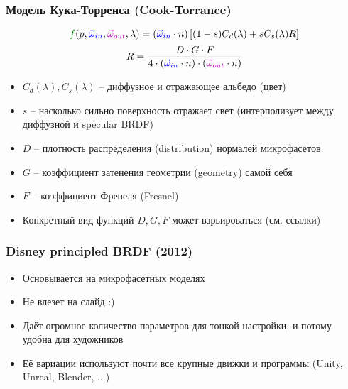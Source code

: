\documentclass{beamer}
\begin{document}
\begin{frame}[fragile]
\frametitle{Модель Кука-Торренса (Cook-Torrance)}
\begin{equation*}
{\color{green}f}(p, {\color{blue}\vec\omega_{in}}, {\color{magenta}\vec\omega_{out}}, \lambda) = ({\color{blue}\vec\omega_{in}} \cdot n)
\left[ (1-s) C_d(\lambda) + s C_s(\lambda) R\right]
\end{equation*}
\begin{equation*}
R = \frac{D \cdot G \cdot F}{4 \cdot ({\color{blue}\vec\omega_{in}} \cdot n) \cdot ({\color{magenta}\vec\omega_{out}} \cdot n)}
\end{equation*}
\pause
\begin{itemize}
\item \begin{math}C_d(\lambda), C_s(\lambda)\end{math} -- диффузное и отражающее альбедо (цвет)
\item \begin{math}s\end{math} -- насколько сильно поверхность отражает свет (интерполизует между диффузной и specular BRDF)
\item \begin{math}D\end{math} -- плотность распределения (distribution) нормалей микрофасетов
\item \begin{math}G\end{math} -- коэффициент затенения геометрии (geometry) самой себя
\item \begin{math}F\end{math} -- коэффициент Френеля (Fresnel)
\item Конкретный вид функций \begin{math}D, G, F\end{math} может варьироваться (см. ссылки)
\end{itemize}
\end{frame}

\begin{frame}[fragile]
\frametitle{Disney principled BRDF (2012)}
\begin{itemize}
\item Основывается на микрофасетных моделях
\item Не влезет на слайд :)
\item Даёт огромное количество параметров для тонкой настройки, и потому удобна для художников
\item Её вариации используют почти все крупные движки и программы (Unity, Unreal, Blender, ...)
\end{itemize}
\end{frame}
\end{document}
